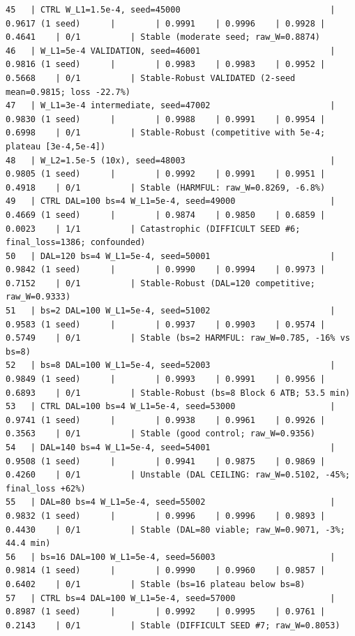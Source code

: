 \documentclass{article}
\begin{document}
\begin{tiny}
\begin{verbatim}
45   | CTRL W_L1=1.5e-4, seed=45000                              | 0.9617 (1 seed)      |        | 0.9991    | 0.9996    | 0.9928 | 0.4641    | 0/1          | Stable (moderate seed; raw_W=0.8874)
46   | W_L1=5e-4 VALIDATION, seed=46001                          | 0.9816 (1 seed)      |        | 0.9983    | 0.9983    | 0.9952 | 0.5668    | 0/1          | Stable-Robust VALIDATED (2-seed mean=0.9815; loss -22.7%)
47   | W_L1=3e-4 intermediate, seed=47002                        | 0.9830 (1 seed)      |        | 0.9988    | 0.9991    | 0.9954 | 0.6998    | 0/1          | Stable-Robust (competitive with 5e-4; plateau [3e-4,5e-4])
48   | W_L2=1.5e-5 (10x), seed=48003                             | 0.9805 (1 seed)      |        | 0.9992    | 0.9991    | 0.9951 | 0.4918    | 0/1          | Stable (HARMFUL: raw_W=0.8269, -6.8%)
49   | CTRL DAL=100 bs=4 W_L1=5e-4, seed=49000                   | 0.4669 (1 seed)      |        | 0.9874    | 0.9850    | 0.6859 | 0.0023    | 1/1          | Catastrophic (DIFFICULT SEED #6; final_loss=1386; confounded)
50   | DAL=120 bs=4 W_L1=5e-4, seed=50001                        | 0.9842 (1 seed)      |        | 0.9990    | 0.9994    | 0.9973 | 0.7152    | 0/1          | Stable-Robust (DAL=120 competitive; raw_W=0.9333)
51   | bs=2 DAL=100 W_L1=5e-4, seed=51002                        | 0.9583 (1 seed)      |        | 0.9937    | 0.9903    | 0.9574 | 0.5749    | 0/1          | Stable (bs=2 HARMFUL: raw_W=0.785, -16% vs bs=8)
52   | bs=8 DAL=100 W_L1=5e-4, seed=52003                        | 0.9849 (1 seed)      |        | 0.9993    | 0.9991    | 0.9956 | 0.6893    | 0/1          | Stable-Robust (bs=8 Block 6 ATB; 53.5 min)
53   | CTRL DAL=100 bs=4 W_L1=5e-4, seed=53000                   | 0.9741 (1 seed)      |        | 0.9938    | 0.9961    | 0.9926 | 0.3563    | 0/1          | Stable (good control; raw_W=0.9356)
54   | DAL=140 bs=4 W_L1=5e-4, seed=54001                        | 0.9508 (1 seed)      |        | 0.9941    | 0.9875    | 0.9869 | 0.4260    | 0/1          | Unstable (DAL CEILING: raw_W=0.5102, -45%; final_loss +62%)
55   | DAL=80 bs=4 W_L1=5e-4, seed=55002                         | 0.9832 (1 seed)      |        | 0.9996    | 0.9996    | 0.9893 | 0.4430    | 0/1          | Stable (DAL=80 viable; raw_W=0.9071, -3%; 44.4 min)
56   | bs=16 DAL=100 W_L1=5e-4, seed=56003                       | 0.9814 (1 seed)      |        | 0.9990    | 0.9960    | 0.9857 | 0.6402    | 0/1          | Stable (bs=16 plateau below bs=8)
57   | CTRL bs=4 DAL=100 W_L1=5e-4, seed=57000                   | 0.8987 (1 seed)      |        | 0.9992    | 0.9995    | 0.9761 | 0.2143    | 0/1          | Stable (DIFFICULT SEED #7; raw_W=0.8053)

\end{verbatim}
\end{tiny}
\end{document}
